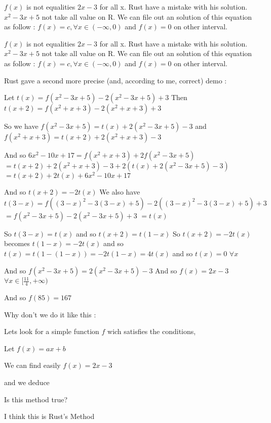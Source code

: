 \begin{mysolution}
	$ f(x)$ is not equalities $ 2x-3$ for all x.
Rust have a mistake with his solution.
$ x^2-3x+5$ not take all value on R.
We can file out an solution of this equation as follow :
$ f(x)=c,\forall x\in (-\infty,0)$ and $ f(x)=0$ on other interval.
\end{mysolution}



\begin{mysolution}
	\begin{tcolorbox}$ f(x)$ is not equalities $ 2x - 3$ for all x.
Rust have a mistake with his solution.
$ x^2 - 3x + 5$ not take all value on R.
We can file out an solution of this equation as follow :
$ f(x) = c,\forall x\in ( - \infty,0)$ and $ f(x) = 0$ on other interval.\end{tcolorbox}

Rust gave a second more precise (and, according to me, correct) demo :

Let $ t(x) = f(x^2 - 3x + 5) - 2(x^2 - 3x + 5) + 3$
Then $ t(x + 2) = f(x^2 + x + 3) - 2(x^2 + x + 3) + 3$

So we have  $ f(x^2 - 3x + 5) = t(x) + 2(x^2 - 3x + 5) - 3$  and $ f(x^2 + x + 3) = t(x + 2) + 2(x^2 + x + 3) - 3$

And so $ 6x^2 - 10x + 17 = f(x^2 + x + 3) + 2f(x^2 - 3x + 5)$ $ = t(x + 2) + 2(x^2 + x + 3) - 3 + 2(t(x) + 2(x^2 - 3x + 5) - 3)$ $ = t(x + 2) + 2t(x) + 6x^2 - 10x + 17$

And so $ t(x + 2) = - 2t(x)$
We also have $ t(3 - x) = f((3 - x)^2 - 3(3 - x) + 5) - 2((3 - x)^2 - 3(3 - x) + 5) + 3$ $ = f(x^2 - 3x + 5) - 2(x^2 - 3x + 5) + 3$ $ = t(x)$

So $ t(3 - x) = t(x)$ and so $ t(x + 2) = t(1 - x)$
So $ t(x + 2) = - 2t(x)$ becomes $ t(1 - x) = - 2t(x)$ and so $ t(x) = t(1 - (1 - x)) = - 2t(1 - x) = 4t(x)$ and so $ t(x) = 0$ $ \forall x$

And so  $ f(x^2 - 3x + 5) = 2(x^2 - 3x + 5) - 3$
And so $ f(x) = 2x - 3$ $ \forall x\in[\frac {11}{4}, + \infty)$

And so $ f(85) = 167$
\end{mysolution}



\begin{mysolution}
	Why don't we do it like this :

Lets look for a simple function $ f$ wich satisfies the conditions,

Let $ f(x) = ax + b$

We can find easily $ f(x) = 2x - 3$
 
and we deduce

Is this method true?

I think this is Rust's Method
\end{mysolution}




